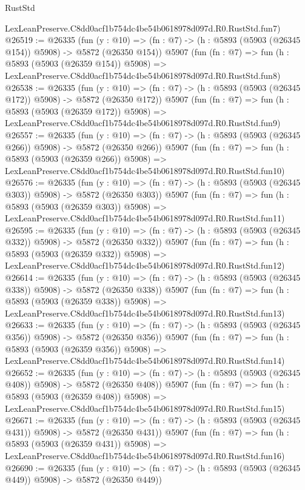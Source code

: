 \begin{lexlean}{RustStd}
\begin{coremodule}
    LexLeanPreserve.C8dd0acf1b754dc4be54b0618978d097d.R0.RustStd.fun7)
@26519 := @26335
    (fun (y : @10) => (fn : @7) -> (h : @5893 (@5903 (@26345 @154)) @5908) -> @5872 (@26350 @154))
    @5907
    (fun (fn : @7) =>
    fun (h : @5893 (@5903 (@26359 @154)) @5908) =>
    LexLeanPreserve.C8dd0acf1b754dc4be54b0618978d097d.R0.RustStd.fun8)
@26538 := @26335
    (fun (y : @10) => (fn : @7) -> (h : @5893 (@5903 (@26345 @172)) @5908) -> @5872 (@26350 @172))
    @5907
    (fun (fn : @7) =>
    fun (h : @5893 (@5903 (@26359 @172)) @5908) =>
    LexLeanPreserve.C8dd0acf1b754dc4be54b0618978d097d.R0.RustStd.fun9)
@26557 := @26335
    (fun (y : @10) => (fn : @7) -> (h : @5893 (@5903 (@26345 @266)) @5908) -> @5872 (@26350 @266))
    @5907
    (fun (fn : @7) =>
    fun (h : @5893 (@5903 (@26359 @266)) @5908) =>
    LexLeanPreserve.C8dd0acf1b754dc4be54b0618978d097d.R0.RustStd.fun10)
@26576 := @26335
    (fun (y : @10) => (fn : @7) -> (h : @5893 (@5903 (@26345 @303)) @5908) -> @5872 (@26350 @303))
    @5907
    (fun (fn : @7) =>
    fun (h : @5893 (@5903 (@26359 @303)) @5908) =>
    LexLeanPreserve.C8dd0acf1b754dc4be54b0618978d097d.R0.RustStd.fun11)
@26595 := @26335
    (fun (y : @10) => (fn : @7) -> (h : @5893 (@5903 (@26345 @332)) @5908) -> @5872 (@26350 @332))
    @5907
    (fun (fn : @7) =>
    fun (h : @5893 (@5903 (@26359 @332)) @5908) =>
    LexLeanPreserve.C8dd0acf1b754dc4be54b0618978d097d.R0.RustStd.fun12)
@26614 := @26335
    (fun (y : @10) => (fn : @7) -> (h : @5893 (@5903 (@26345 @338)) @5908) -> @5872 (@26350 @338))
    @5907
    (fun (fn : @7) =>
    fun (h : @5893 (@5903 (@26359 @338)) @5908) =>
    LexLeanPreserve.C8dd0acf1b754dc4be54b0618978d097d.R0.RustStd.fun13)
@26633 := @26335
    (fun (y : @10) => (fn : @7) -> (h : @5893 (@5903 (@26345 @356)) @5908) -> @5872 (@26350 @356))
    @5907
    (fun (fn : @7) =>
    fun (h : @5893 (@5903 (@26359 @356)) @5908) =>
    LexLeanPreserve.C8dd0acf1b754dc4be54b0618978d097d.R0.RustStd.fun14)
@26652 := @26335
    (fun (y : @10) => (fn : @7) -> (h : @5893 (@5903 (@26345 @408)) @5908) -> @5872 (@26350 @408))
    @5907
    (fun (fn : @7) =>
    fun (h : @5893 (@5903 (@26359 @408)) @5908) =>
    LexLeanPreserve.C8dd0acf1b754dc4be54b0618978d097d.R0.RustStd.fun15)
@26671 := @26335
    (fun (y : @10) => (fn : @7) -> (h : @5893 (@5903 (@26345 @431)) @5908) -> @5872 (@26350 @431))
    @5907
    (fun (fn : @7) =>
    fun (h : @5893 (@5903 (@26359 @431)) @5908) =>
    LexLeanPreserve.C8dd0acf1b754dc4be54b0618978d097d.R0.RustStd.fun16)
@26690 := @26335
    (fun (y : @10) => (fn : @7) -> (h : @5893 (@5903 (@26345 @449)) @5908) -> @5872 (@26350 @449))

\end{coremodule}
\end{lexlean}
